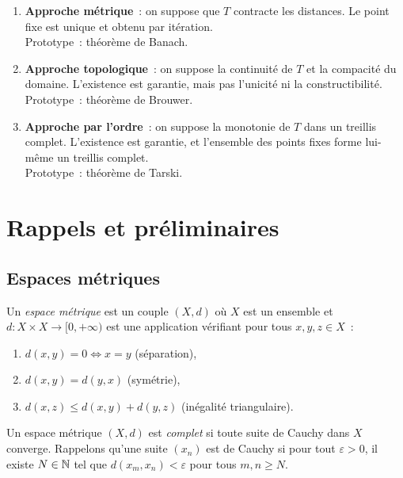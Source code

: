 \begin{intuition}[title=\textbf{Les trois approches}]
\begin{enumerate}
    \item \textbf{Approche m\'etrique}~: on suppose que $T$ contracte les distances.
          Le point fixe est unique et obtenu par it\'eration. \\
          Prototype~: th\'eor\`eme de Banach.
    \item \textbf{Approche topologique}~: on suppose la continuit\'e de $T$ et la
          compacit\'e du domaine. L'existence est garantie, mais pas l'unicit\'e
          ni la constructibilit\'e. \\
          Prototype~: th\'eor\`eme de Brouwer.
    \item \textbf{Approche par l'ordre}~: on suppose la monotonie de $T$ dans un
          treillis complet. L'existence est garantie, et l'ensemble des points
          fixes forme lui-m\^eme un treillis complet. \\
          Prototype~: th\'eor\`eme de Tarski.
\end{enumerate}
\end{intuition}

\section{Rappels et pr\'eliminaires}

\subsection{Espaces m\'etriques}

\begin{definition}
Un \emph{espace m\'etrique} est un couple $(X, d)$ o\`u $X$ est un ensemble et
$d : X \times X \to [0, +\infty)$ est une application v\'erifiant pour tous
$x, y, z \in X$~:
\begin{enumerate}
    \item $d(x, y) = 0 \Leftrightarrow x = y$ \quad (s\'eparation),
    \item $d(x, y) = d(y, x)$ \quad (sym\'etrie),
    \item $d(x, z) \leq d(x, y) + d(y, z)$ \quad (in\'egalit\'e triangulaire).
\end{enumerate}
\end{definition}

\begin{definition}
Un espace m\'etrique $(X, d)$ est \emph{complet} si toute suite de Cauchy dans
$X$ converge. Rappelons qu'une suite $(x_n)$ est de Cauchy si pour tout
$\varepsilon > 0$, il existe $N \in \mathbb{N}$ tel que $d(x_m, x_n) < \varepsilon$
pour tous $m, n \geq N$.
\end{definition}


